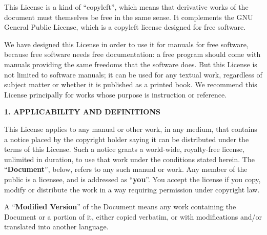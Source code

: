 \ifdefined\chs

\fi

\ifdefined\eng
This License is a kind of ``copyleft'', which means that derivative
works of the document must themselves be free in the same sense.  It
complements the GNU General Public License, which is a copyleft
license designed for free software.
\fi

\ifdefined\chs

\fi

\ifdefined\eng
We have designed this License in order to use it for manuals for free
software, because free software needs free documentation: a free
program should come with manuals providing the same freedoms that the
software does.  But this License is not limited to software manuals;
it can be used for any textual work, regardless of subject matter or
whether it is published as a printed book.  We recommend this License
principally for works whose purpose is instruction or reference.
\fi

\ifdefined\chs

\fi

\ifdefined\eng
\fi

\ifdefined\chs

\fi

\ifdefined\eng
\begin{center}
{\Large\bf 1. APPLICABILITY AND DEFINITIONS\par}
\end{center}
\fi

\ifdefined\chs

\fi

\ifdefined\eng
This License applies to any manual or other work, in any medium, that
contains a notice placed by the copyright holder saying it can be
distributed under the terms of this License.  Such a notice grants a
world-wide, royalty-free license, unlimited in duration, to use that
work under the conditions stated herein.  The ``\textbf{Document}'', below,
refers to any such manual or work.  Any member of the public is a
licensee, and is addressed as ``\textbf{you}''.  You accept the license if you
copy, modify or distribute the work in a way requiring permission
under copyright law.
\fi

\ifdefined\chs

\fi

\ifdefined\eng
A ``\textbf{Modified Version}'' of the Document means any work containing the
Document or a portion of it, either copied verbatim, or with
modifications and/or translated into another language.
\fi

